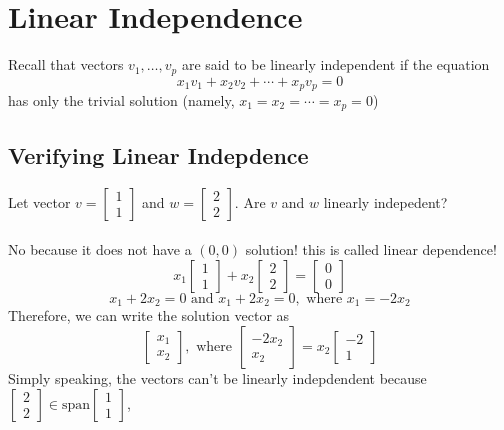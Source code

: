 \section{Linear Independence}
Recall that vectors $v_1, \dots, v_p$ are said to be linearly independent if the equation 
\[
  x_1v_1 + x_2v_2 + \cdots + x_pv_p = 0
\]
has only the trivial solution (namely, $x_1 = x_2 = \cdots = x_p = 0$)
\subsection{Verifying Linear Indepdence}
Let vector $v = \begin{bmatrix}1 \\ 1\end{bmatrix}$ and 
$w = \begin{bmatrix}2 \\ 2\end{bmatrix}$. Are $v$ and $w$ linearly indepedent?
\\\\
No because it does not have a $(0, 0)$ solution! this is called linear dependence! 
\[
  x_1\begin{bmatrix}1 \\ 1\end{bmatrix} + x_2\begin{bmatrix}2 \\ 2\end{bmatrix} = 
  \begin{bmatrix} 0 \\ 0 \end{bmatrix}
\]
\[
  x_1 + 2x_2 = 0 \text{ and } x_1 + 2x_2 = 0, \text{ where } x_1 = -2x_2
\] Therefore, we can write the solution vector as 
\[
  \begin{bmatrix} x_1 \\ x_2 \end{bmatrix}, \text{ where } 
  \begin{bmatrix} -2x_2 \\ x_2 \end{bmatrix} = 
  x_2\begin{bmatrix} -2 \\ 1\end{bmatrix}
\] 
Simply speaking, the vectors can't be linearly indepdendent because  
$\begin{bmatrix} 2 \\ 2 \end{bmatrix} \in \text{span}\begin{bmatrix} 1\\1 \end{bmatrix}$, 
